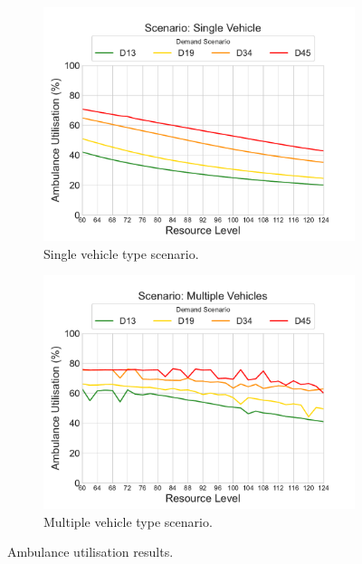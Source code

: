 \documentclass[preprint,12pt]{elsarticle}
\begin{document}
\begin{figure}
\begin{center}
\begin{subfigure}{0.42\textwidth}
\includegraphics[width=\textwidth]{img/plots/single_AmbulanceUtilisation}
\caption{Single vehicle type scenario.}
\label{fig:results_ambulance_utilisation_single}
\end{subfigure}
\begin{subfigure}{0.42\textwidth}
\includegraphics[width=\textwidth]{img/plots/multiple_AmbulanceUtilisation}
\caption{Multiple vehicle type scenario.}
\label{fig:results_ambulance_utilisation_multiple}
\end{subfigure}
\end{center}
\caption{Ambulance utilisation results.}
\label{fig:results_ambulance_utilisation}
\end{figure}
\end{document}
